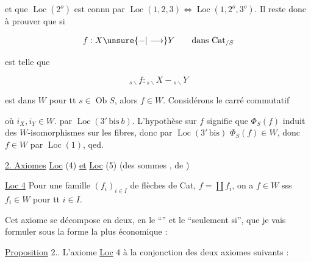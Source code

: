 
et que $\operatorname{Loc}(2^o)$ est connu par $\operatorname{Loc}(1,2,3)\Longleftrightarrow\operatorname{Loc}(1,2^o,3^o)$. Il reste donc à prouver que si

\[
f:X\unsure{{-}|\longrightarrow}Y\qquad\text{dans }\mathrm{Cat}_{/S}
\]

est telle que 

\[
{}_{s\backslash}f:{}_{s\backslash}X{-}{}_{s\backslash}Y
\]

est dans $W$ pour tt $s\in\operatorname{Ob}S$, alors $f\in W$. Considérons  le carré commutatif


où $i_X,i_Y\in W$. par $\operatorname{Loc}(3'\,\mathrm{bis}\ b)$. L'hypothèse sur $f$ signifie que $\Phi_S(f)$ induit des $W$-isomorphismes sur les fibres, donc par $\operatorname{Loc}(3'\,\mathrm{bis})$ $\Phi_S(f)\in W$, donc $f\in W$ par $\operatorname{Loc}(1)$, qed.

\uline{2. Axiomes} \uline{Loc} (4) \uline{et} \uline{Loc} (5) (des sommes , de )


\uline{Loc 4}  Pour une famille $(f_i)_{i\in I}$ de flèches de Cat,  $f=\coprod f_i$, on a $f\in W$ sss $f_i\in W$ pour tt $i\in I$.

Cet axiome se décompose en deux, en le ``'' et le ``seulement si'', que je vais  formuler sous la forme la plus économique :

\uline{Proposition} 2.. L'axiome \uline{Loc} 4   à la conjonction des deux axiomes suivants :


